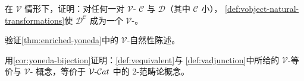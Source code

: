 \begin{exercise}\label{ex:functor-category-vcategory}
在 $\mathcal{V}$ \trComplete{}情形下，证明：对任何一对 $\mathcal{V}$-%
\trCategory{} $\mathcal{C}$ 与 $\mathcal{D}$（其中 $\mathcal{C}$ 小），%
\cref{def:vobject-natural-transformations}使 $\mathcal{D}^{\mathcal{C}}$ 成为一个
$\mathcal{V}$-\trCategory。
\end{exercise}

\begin{exercise}\label{ex:yoneda-vnaturality}
验证\cref{thm:enriched-yoneda}中的 $\mathcal{V}$-自然性陈述。
\end{exercise}

\begin{exercise}\label{ex:vequivalence-vadjunction-2category}
用\cref{cor:yoneda-bijection}证明：\cref{def:vequivalent}与%
\cref{def:vadjunction}中所给的 $\mathcal{V}$-等价与 $\mathcal{V}$-%
\trAdjunction{}概念，等价于 $\mathcal{V}\text{-}\mathcal{C}at$ 中的 2-范畴论概念。
\end{exercise}


